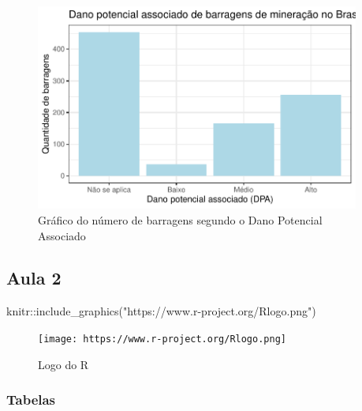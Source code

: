 \documentclass[
  letterpaper,
  DIV=11,
  numbers=noendperiod]{scrartcl}
\newenvironment{Shaded}{\begin{snugshade}}{\end{snugshade}}
\newcommand{\FunctionTok}[1]{\textcolor[rgb]{0.28,0.35,0.67}{#1}}
\newcommand{\NormalTok}[1]{\textcolor[rgb]{0.00,0.23,0.31}{#1}}
\newcommand{\SpecialCharTok}[1]{\textcolor[rgb]{0.37,0.37,0.37}{#1}}
\newcommand{\StringTok}[1]{\textcolor[rgb]{0.13,0.47,0.30}{#1}}
\begin{document}
\begin{figure}[H]

{\centering \includegraphics[width=0.95\textwidth,height=\textheight]{pratica3_files/figure-pdf/fig-grafico-dpa-1.pdf}

}

\caption{\label{fig-grafico-dpa}Gráfico do número de barragens segundo o
Dano Potencial Associado}

\end{figure}

\hypertarget{aula-2}{%
\subsection{Aula 2}\label{aula-2}}

\begin{Shaded}
\begin{Highlighting}[]
\NormalTok{knitr}\SpecialCharTok{::}\FunctionTok{include\_graphics}\NormalTok{(}\StringTok{"https://www.r{-}project.org/Rlogo.png"}\NormalTok{)}
\end{Highlighting}
\end{Shaded}

\begin{figure}[H]

\hfill{} \texttt{[image: https://www.r-project.org/Rlogo.png]}

\caption{Logo do R}

\end{figure}

\hypertarget{tabelas}{%
\subsubsection{Tabelas}\label{tabelas}}
\end{document}
